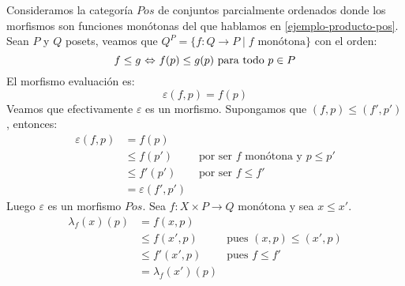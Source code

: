 \begin{example}
Consideramos la categoría $Pos$ de conjuntos parcialmente ordenados donde los morfismos son funciones monótonas del que hablamos en \ref{ejemplo-producto-pos}.
Sean $P$ y $Q$ posets, veamos que $Q^P = \{ f \colon Q \to P \mid f \text{ monótona}\}$ con el orden:
\[ f \leq g {\ \Leftrightarrow\ } f(p) \leq g(p) \text{ para todo }p \in P \]
El morfismo evaluación es:
\[ \varepsilon (f,p) = f(p) \]
Veamos que efectivamente $\varepsilon$ es un morfismo.
Supongamos que $(f,p) \leq (f',p')$, entonces:
\begin{align*}
\varepsilon(f,p) & = f(p) & \\
& \leq f(p') & \text{ por ser }f\text{ monótona y }p\leq p'\\
& \leq f'(p') & \text{ por ser }f \leq f'\\
& = \varepsilon(f',p')
\end{align*}
Luego $\varepsilon$ es un morfismo $Pos$.
Sea $f \colon X \times P \to Q$ monótona y sea $x \leq x'$.
\begin{align*}
\lambda_f(x)(p) & = f(x,p) & \\
& \leq f(x',p) & \text{pues }(x,p) \leq (x',p)\\
& \leq f'(x',p) & \text{pues }f \leq f'\\
& = \lambda_f(x')(p)
\end{align*}
\end{example}

